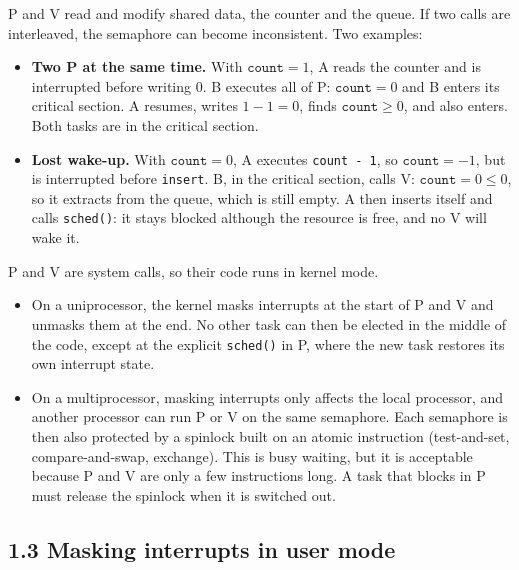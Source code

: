 \documentclass[letterpaper, 11pt]{article}
\newcommand{\1}{\mathds{1}}	%
\theoremstyle{definition}
\begin{document}
P and V read and modify shared data, the counter and the queue. If two calls are interleaved, the semaphore can become inconsistent. Two examples:
\begin{itemize}
  \item \textbf{Two P at the same time.} With $\texttt{count} = 1$, A reads the counter and is interrupted before writing $0$. B executes all of P: $\texttt{count} = 0$ and B enters its critical section. A resumes, writes $1 - 1 = 0$, finds $\texttt{count} \ge 0$, and also enters. Both tasks are in the critical section.
  \item \textbf{Lost wake-up.} With $\texttt{count} = 0$, A executes \texttt{count - 1}, so $\texttt{count} = -1$, but is interrupted before \texttt{insert}. B, in the critical section, calls V: $\texttt{count} = 0 \le 0$, so it extracts from the queue, which is still empty. A then inserts itself and calls \texttt{sched()}: it stays blocked although the resource is free, and no V will wake it.
\end{itemize}

P and V are system calls, so their code runs in kernel mode.
\begin{itemize}
  \item On a uniprocessor, the kernel masks interrupts at the start of P and V and unmasks them at the end. No other task can then be elected in the middle of the code, except at the explicit \texttt{sched()} in P, where the new task restores its own interrupt state.
  \item On a multiprocessor, masking interrupts only affects the local processor, and another processor can run P or V on the same semaphore. Each semaphore is then also protected by a spinlock built on an atomic instruction (test-and-set, compare-and-swap, exchange). This is busy waiting, but it is acceptable because P and V are only a few instructions long. A task that blocks in P must release the spinlock when it is switched out.
\end{itemize}

\subsection*{1.3 Masking interrupts in user mode}
\end{document}
